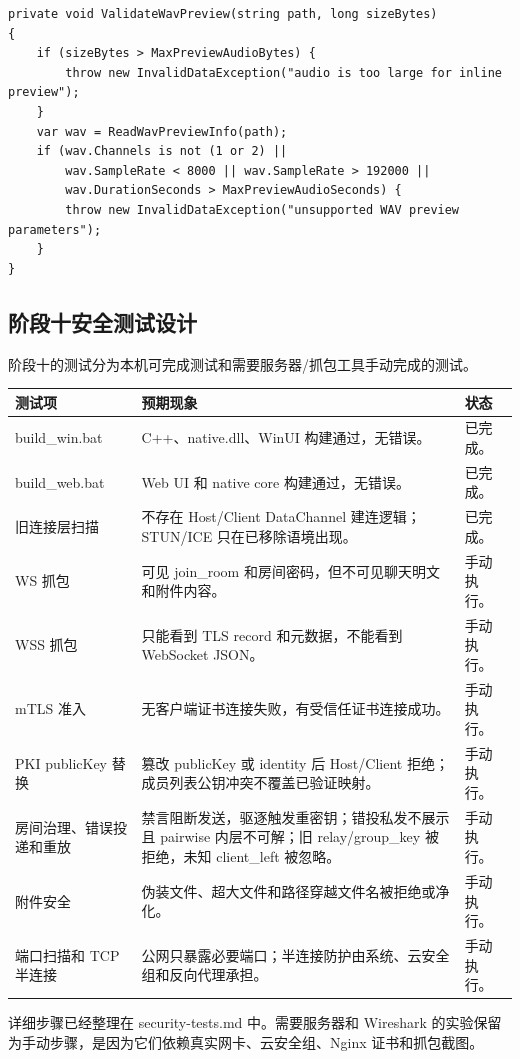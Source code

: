 \documentclass[UTF8,a4paper,12pt]{ctexart}
\begin{document}
\begin{lstlisting}[language={[Sharp]C},caption={MainWindow.xaml.cs：附件预览策略}]
private void ValidateWavPreview(string path, long sizeBytes)
{
    if (sizeBytes > MaxPreviewAudioBytes) {
        throw new InvalidDataException("audio is too large for inline preview");
    }
    var wav = ReadWavPreviewInfo(path);
    if (wav.Channels is not (1 or 2) ||
        wav.SampleRate < 8000 || wav.SampleRate > 192000 ||
        wav.DurationSeconds > MaxPreviewAudioSeconds) {
        throw new InvalidDataException("unsupported WAV preview parameters");
    }
}
\end{lstlisting}

\subsection{阶段十安全测试设计}

阶段十的测试分为本机可完成测试和需要服务器/抓包工具手动完成的测试。

\begin{longtable}{p{4cm}p{5cm}p{5cm}}
\toprule
测试项 & 预期现象 & 状态 \\
\midrule
build\_win.bat & C++、native.dll、WinUI 构建通过，无错误。 & 已完成。\\
build\_web.bat & Web UI 和 native core 构建通过，无错误。 & 已完成。\\
旧连接层扫描 & 不存在 Host/Client DataChannel 建连逻辑；STUN/ICE 只在已移除语境出现。 & 已完成。\\
WS 抓包 & 可见 join\_room 和房间密码，但不可见聊天明文和附件内容。 & 手动执行。\\
WSS 抓包 & 只能看到 TLS record 和元数据，不能看到 WebSocket JSON。 & 手动执行。\\
mTLS 准入 & 无客户端证书连接失败，有受信任证书连接成功。 & 手动执行。\\
PKI publicKey 替换 & 篡改 publicKey 或 identity 后 Host/Client 拒绝；成员列表公钥冲突不覆盖已验证映射。 & 手动执行。\\
房间治理、错误投递和重放 & 禁言阻断发送，驱逐触发重密钥；错投私发不展示且 pairwise 内层不可解；旧 relay/group\_key 被拒绝，未知 client\_left 被忽略。 & 手动执行。\\
附件安全 & 伪装文件、超大文件和路径穿越文件名被拒绝或净化。 & 手动执行。\\
端口扫描和 TCP 半连接 & 公网只暴露必要端口；半连接防护由系统、云安全组和反向代理承担。 & 手动执行。\\
\bottomrule
\end{longtable}

详细步骤已经整理在 security-tests.md 中。需要服务器和 Wireshark 的实验保留为手动步骤，是因为它们依赖真实网卡、云安全组、Nginx 证书和抓包截图。
\end{document}
